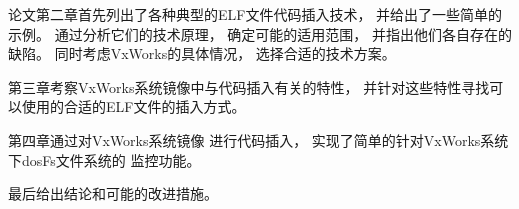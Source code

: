 论文第二章首先列出了各种典型的ELF文件代码插入技术，
并给出了一些简单的示例。
通过分析它们的技术原理，
确定可能的适用范围，
并指出他们各自存在的缺陷。
同时考虑VxWorks的具体情况，
选择合适的技术方案。

第三章考察VxWorks系统镜像中与代码插入有关的特性，
并针对这些特性寻找可以使用的合适的ELF文件的插入方式。

第四章通过对VxWorks系统镜像
进行代码插入，
实现了简单的针对VxWorks系统下dosFs文件系统的
监控功能。

最后给出结论和可能的改进措施。

